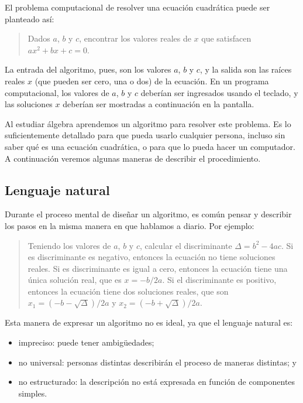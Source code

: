 El problema computacional de resolver una ecuación cuadrática puede ser
planteado así:

\begin{quote}
Dados \(a\), \(b\) y \(c\), encontrar los valores reales de \(x\) que satisfacen
\(ax^2 + bx + c = 0\).
\end{quote}

La entrada del algoritmo, pues, son los valores \(a\), \(b\) y \(c\), y la
salida son las raíces reales \(x\) (que pueden ser cero, una o dos) de la
ecuación. En un programa computacional, los valores de \(a\), \(b\) y \(c\)
deberían ser ingresados usando el teclado, y las soluciones \(x\) deberían
ser mostradas a continuación en la pantalla.

Al estudiar álgebra aprendemos un algoritmo para resolver este problema.
Es lo suficientemente detallado para que pueda usarlo cualquier persona,
incluso sin saber qué es una ecuación cuadrática, o para que lo pueda
hacer un computador. A continuación veremos algunas maneras de describir
el procedimiento.

\subsection{Lenguaje natural}

Durante el proceso mental de diseñar un algoritmo, es común pensar y
describir los pasos en la misma manera en que hablamos a diario. Por
ejemplo:

\begin{quote}
Teniendo los valores de \(a\), \(b\) y \(c\), calcular el discriminante
\(\Delta = b^2 - 4ac\). Si es discriminante es negativo, entonces la ecuación no
tiene soluciones reales. Si es discriminante es igual a cero, entonces
la ecuación tiene una única solución real, que es \(x = -b/2a\). Si el
discriminante es positivo, entonces la ecuación tiene dos soluciones
reales, que son \(x_1 = (-b - \sqrt{\Delta})/2a\) y \(x_2 = (-b + \sqrt{\Delta})/2a\).
\end{quote}

Esta manera de expresar un algoritmo no es ideal, ya que el lenguaje
natural es:

\begin{itemize}
\item
  impreciso: puede tener ambigüedades;
\item
  no universal: personas distintas describirán el proceso de maneras
  distintas; y
\item
  no estructurado: la descripción no está expresada en función de
  componentes simples.
\end{itemize}

